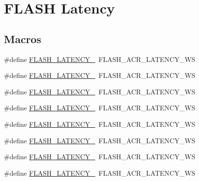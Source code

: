 \hypertarget{group___f_l_a_s_h___latency}{}\section{F\+L\+A\+SH Latency}
\label{group___f_l_a_s_h___latency}
\subsection*{Macros}
\begin{DoxyCompactItemize}
\item 
\#define \hyperlink{group___f_l_a_s_h___latency_ga1276f51e97dc9857ca261fae4eb890f3}{F\+L\+A\+S\+H\+\_\+\+L\+A\+T\+E\+N\+C\+Y\+\_}~F\+L\+A\+S\+H\+\_\+\+A\+C\+R\+\_\+\+L\+A\+T\+E\+N\+C\+Y\+\_\+WS
\item 
\#define \hyperlink{group___f_l_a_s_h___latency_ga28c611f2cb4a3772ab37c538357fd5f6}{F\+L\+A\+S\+H\+\_\+\+L\+A\+T\+E\+N\+C\+Y\+\_}~F\+L\+A\+S\+H\+\_\+\+A\+C\+R\+\_\+\+L\+A\+T\+E\+N\+C\+Y\+\_\+WS
\item 
\#define \hyperlink{group___f_l_a_s_h___latency_ga69d209f9cb4f625010d72555c8dceb03}{F\+L\+A\+S\+H\+\_\+\+L\+A\+T\+E\+N\+C\+Y\+\_}~F\+L\+A\+S\+H\+\_\+\+A\+C\+R\+\_\+\+L\+A\+T\+E\+N\+C\+Y\+\_\+WS
\item 
\#define \hyperlink{group___f_l_a_s_h___latency_ga2f607c9fa7bdcd53df0e98a7b1e67496}{F\+L\+A\+S\+H\+\_\+\+L\+A\+T\+E\+N\+C\+Y\+\_}~F\+L\+A\+S\+H\+\_\+\+A\+C\+R\+\_\+\+L\+A\+T\+E\+N\+C\+Y\+\_\+WS
\item 
\#define \hyperlink{group___f_l_a_s_h___latency_ga65fe32d2c25a3d5ee3dce89dee459fa5}{F\+L\+A\+S\+H\+\_\+\+L\+A\+T\+E\+N\+C\+Y\+\_}~F\+L\+A\+S\+H\+\_\+\+A\+C\+R\+\_\+\+L\+A\+T\+E\+N\+C\+Y\+\_\+WS
\item 
\#define \hyperlink{group___f_l_a_s_h___latency_ga2517d62fa71e27b3b53223bbaacd06f7}{F\+L\+A\+S\+H\+\_\+\+L\+A\+T\+E\+N\+C\+Y\+\_}~F\+L\+A\+S\+H\+\_\+\+A\+C\+R\+\_\+\+L\+A\+T\+E\+N\+C\+Y\+\_\+WS
\item 
\#define \hyperlink{group___f_l_a_s_h___latency_gad047485b4941997af3c55ad61ad9c13a}{F\+L\+A\+S\+H\+\_\+\+L\+A\+T\+E\+N\+C\+Y\+\_}~F\+L\+A\+S\+H\+\_\+\+A\+C\+R\+\_\+\+L\+A\+T\+E\+N\+C\+Y\+\_\+WS
\item 
\#define \hyperlink{group___f_l_a_s_h___latency_ga09e9f01dd2e6e361adc9c995a5a73510}{F\+L\+A\+S\+H\+\_\+\+L\+A\+T\+E\+N\+C\+Y\+\_}~F\+L\+A\+S\+H\+\_\+\+A\+C\+R\+\_\+\+L\+A\+T\+E\+N\+C\+Y\+\_\+WS
\end{DoxyCompactItemize}


